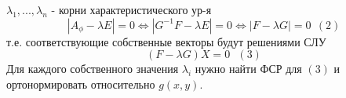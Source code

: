\begin{remark}
    $\lambda_1,...,\lambda_n$ - корни характеристического ур-я 
    $$|A_\phi - \lambda E| = 0 \Longleftrightarrow |G^{-1}F - \lambda E| = 0 \Longleftrightarrow |F - \lambda G| = 0  \ \ (2)$$
    т.е. соответствующие собственные векторы будут решениями СЛУ 
    $$(F-\lambda G)X = 0 \ \ \ (3)$$
    Для каждого собственного значения $\lambda_i$ нужно найти ФСР для $(3)$ и ортонормировать относительно $g(x, y)$.
\end{remark}

 
 